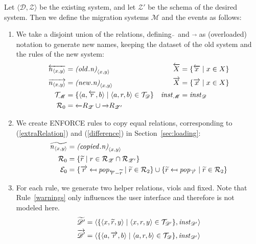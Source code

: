 \documentclass[runningheads]{llncs}
\newcommand{\id}[1]{\text{\it #1\/}}
\newcommand{\popF}[1]{\id{pop}_{#1}}
\newcommand{\instance}{\mathbin{\id{inst}}}
\newcommand{\declare}[3]{\id{#1}_{\pair{#2}{#3}}}
\newcommand{\pair}[2]{\langle{#1},{#2}\rangle}
\newcommand{\triple}[3]{\langle{#1},{#2},{#3}\rangle}
\newcommand{\rels}{\mathcal{R}}   %
\newcommand{\triples}{\mathcal{T}}
\newcommand{\enforces}{\mathcal{E}}
\newcommand{\rules}{\mathcal{U}}
\newcommand{\dataset}{\mathscr{D}}
\newcommand{\schema}{\mathscr{Z}}
\newcommand{\migrsys}{\mathscr{M}}
\begin{document}
   Let $\pair{\dataset}{\schema}$ be the existing system, and let ${\schema'}$ be the schema of the desired system.
   Then we define the migration systems $\migrsys$ and the events as follows:
   \begin{enumerate}
   \item We take a disjoint union of the relations, defining $\overleftarrow~$ and $\overrightarrow~$ as (overloaded) notation to generate new names, keeping the dataset of the old system and the rules of the new system:
   \begin{align}
   \overleftarrow{\declare{n}{x}{y}}&=\declare{(\id{old}.n)}{x}{y}&\overleftarrow{X} &= \{\overleftarrow{x}\mid x\in X\}\\
   \overrightarrow{\declare{n}{x}{y}}&=\declare{(\id{new}.n)}{x}{y}& \overrightarrow{X} &= \{\overrightarrow{x}\mid x\in X\}\\
   \triples_\migrsys &= \{\triple{a}{\overleftarrow{r}}{b} \mid \triple{a}{r}{b}\in\triples_\dataset\}&
   \instance_\migrsys &= \instance_\dataset\\
   \rels_\theenumi &= \overleftarrow\rels_{\schema} \cup \overrightarrow\rels_{\schema'}
   \end{align}
   \item We create ENFORCE rules to copy equal relations, corresponding to (\ref{extraRelation}) and (\ref{difference}) in Section~\ref{sec:loading}:
   \begin{align}
   \widetilde{\declare{n}{x}{y}} &= \declare{(\id{copied}.n)}{x}{y}\\
   \rels_\theenumi &= \{\widetilde{r}\mid r \in \rels_\schema \cap \rels_{\schema'}\}\\
   \enforces_\theenumi &= \{\overrightarrow{r}\mapsfrom \popF{\overleftarrow{r} - \widetilde{r}} \mid \widetilde{r} \in \rels_2\} \cup \{\widetilde{r}\mapsfrom \popF{\overrightarrow{r}} \mid \widetilde{r} \in \rels_2\}
   \end{align}
   \item For each rule, we generate two helper relations, viols and fixed. Note that Rule~\ref{warnings} only influences the user interface and therefore is not modeled here.
   \begin{align}
   \widetilde{\dataset'} &= \pair{\{\triple{x}{\widetilde{r}}{y}\mid \triple{x}{r}{y} \in \triples_{\dataset'}\}}{\instance_{\dataset'}}\\
   \overrightarrow{\dataset'} &= \pair{\{\triple{a}{\overrightarrow{r}}{b} \mid \triple{a}{r}{b}\in\triples_\dataset\}}{\instance_{\dataset'}} \\

\end{align}
\end{enumerate}
\end{document}
